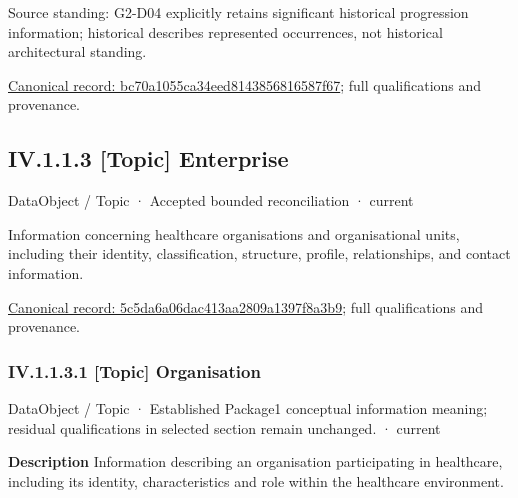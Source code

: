 Source standing: G2-D04 explicitly retains significant historical progression information; historical describes represented occurrences, not historical architectural standing.


{\footnotesize \href{../../../../../../../continuum/application/data-object/topic/bc70a1055ca34eed8143856816587f67.md}{Canonical record: bc70a1055ca34eed8143856816587f67}; full qualifications and provenance.}\par
\subsection*{IV.1.1.3 [Topic] Enterprise}
\label{navigation:IV.1.1.3}

\label{element:5c5da6a06dac413aa2809a1397f8a3b9}
{\small DataObject / Topic · Accepted bounded reconciliation · current}\par

Information concerning healthcare organisations and organisational units, including their identity, classification, structure, profile, relationships, and contact information.


{\footnotesize \href{../../../../../../../continuum/application/data-object/topic/5c5da6a06dac413aa2809a1397f8a3b9.md}{Canonical record: 5c5da6a06dac413aa2809a1397f8a3b9}; full qualifications and provenance.}\par
\subsubsection*{IV.1.1.3.1 [Topic] Organisation}
\label{navigation:IV.1.1.3.1}

\label{element:dd3ba70128874caeb2d5da419d006c49}
{\small DataObject / Topic · Established Package1 conceptual information meaning; residual qualifications in selected section remain unchanged. · current}\par

\textbf{Description}
Information describing an organisation participating in healthcare, including its identity, characteristics and role within the healthcare environment.



